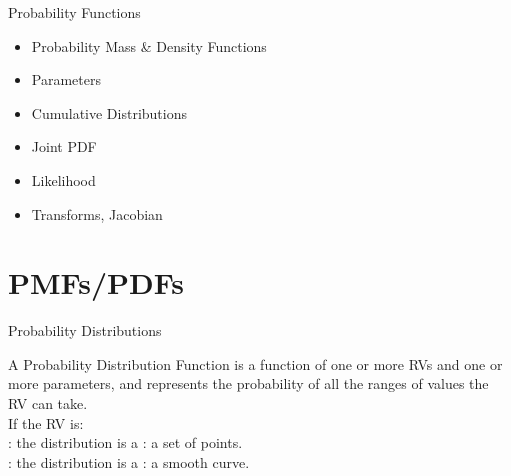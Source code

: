 \documentclass[10pt,sans,english,compress,table,xcolor=dvipsnames]{beamer}
\begin{document}
\begin{frame}{Probability Functions}
\large
\begin{itemize}
\item Probability Mass \& Density Functions\\[1ex]
\item Parameters\\[1ex]
\item Cumulative Distributions\\[1ex]
\item Joint PDF\\[1ex]
\item Likelihood\\[1ex]
\item Transforms, Jacobian\\[1ex]
\end{itemize}

\end{frame} 

\section*{PMFs/PDFs}

\begin{frame}{Probability Distributions}

A Probability Distribution Function is a function of one or more RVs and one or more parameters, and represents the probability of all the ranges of values the RV can take.\\[1ex]

If the RV is:\\[1ex]
: the distribution is a : a set of points.\\[1ex]
: the distribution is a : a smooth curve.\\[1ex]

 \\[1ex]
 


\end{frame} 
\end{document}
